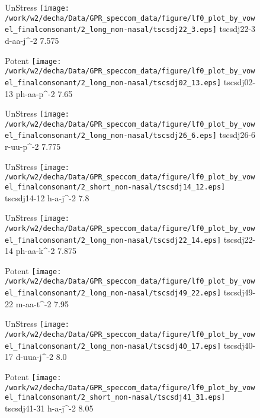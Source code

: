 \documentclass{article}
\begin{document}
\begin{figure}[t]
\begin{minipage}[b]{.24\textwidth}
UnStress
\centering
\texttt{[image: /work/w2/decha/Data/GPR\_speccom\_data/figure/lf0\_plot\_by\_vowel\_finalconsonant/2\_long\_non-nasal/tscsdj22\_3.eps]}
tscsdj22-3 d-aa-j\textasciicircum-2 7.575
\end{minipage}
\begin{minipage}[b]{.24\textwidth}
\colorbox{Apricot}{Potent}
\centering
\texttt{[image: /work/w2/decha/Data/GPR\_speccom\_data/figure/lf0\_plot\_by\_vowel\_finalconsonant/2\_long\_non-nasal/tscsdj02\_13.eps]}
tscsdj02-13 ph-aa-p\textasciicircum-2 7.65
\end{minipage}
\begin{minipage}[b]{.24\textwidth}
UnStress
\centering
\texttt{[image: /work/w2/decha/Data/GPR\_speccom\_data/figure/lf0\_plot\_by\_vowel\_finalconsonant/2\_long\_non-nasal/tscsdj26\_6.eps]}
tscsdj26-6 r-uu-p\textasciicircum-2 7.775
\end{minipage}
\begin{minipage}[b]{.24\textwidth}
UnStress
\centering
\texttt{[image: /work/w2/decha/Data/GPR\_speccom\_data/figure/lf0\_plot\_by\_vowel\_finalconsonant/2\_short\_non-nasal/tscsdj14\_12.eps]}
tscsdj14-12 h-a-j\textasciicircum-2 7.8
\end{minipage}
\end{figure}

\begin{figure}[t]
\begin{minipage}[b]{.24\textwidth}
UnStress
\centering
\texttt{[image: /work/w2/decha/Data/GPR\_speccom\_data/figure/lf0\_plot\_by\_vowel\_finalconsonant/2\_long\_non-nasal/tscsdj22\_14.eps]}
tscsdj22-14 ph-aa-k\textasciicircum-2 7.875
\end{minipage}
\begin{minipage}[b]{.24\textwidth}
\colorbox{Apricot}{Potent}
\centering
\texttt{[image: /work/w2/decha/Data/GPR\_speccom\_data/figure/lf0\_plot\_by\_vowel\_finalconsonant/2\_long\_non-nasal/tscsdj49\_22.eps]}
tscsdj49-22 m-aa-t\textasciicircum-2 7.95
\end{minipage}
\begin{minipage}[b]{.24\textwidth}
UnStress
\centering
\texttt{[image: /work/w2/decha/Data/GPR\_speccom\_data/figure/lf0\_plot\_by\_vowel\_finalconsonant/2\_long\_non-nasal/tscsdj40\_17.eps]}
tscsdj40-17 d-uua-j\textasciicircum-2 8.0
\end{minipage}
\begin{minipage}[b]{.24\textwidth}
\colorbox{Apricot}{Potent}
\centering
\texttt{[image: /work/w2/decha/Data/GPR\_speccom\_data/figure/lf0\_plot\_by\_vowel\_finalconsonant/2\_short\_non-nasal/tscsdj41\_31.eps]}
tscsdj41-31 h-a-j\textasciicircum-2 8.05
\end{minipage}
\end{figure}
\end{document}
